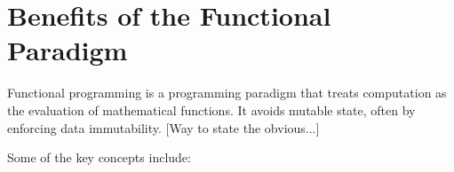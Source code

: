 \documentclass{l4proj}
\begin{document}






\section{Benefits of the Functional Paradigm}

Functional programming is a programming paradigm that treats computation as the evaluation of mathematical functions.
It avoids mutable state, often by enforcing data immutability.
[Way to state the obvious...]

Some of the key concepts include:
\end{document}
